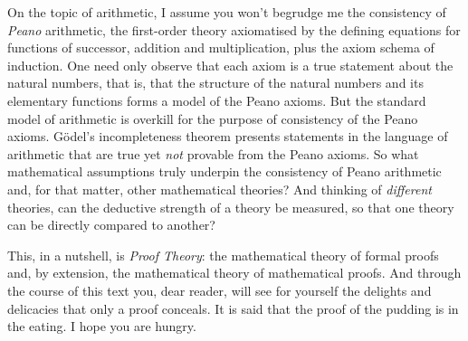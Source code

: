 
On the topic of arithmetic, I assume you won't begrudge me the consistency of \emph{Peano} arithmetic, the first-order theory axiomatised by the defining equations for functions of successor, addition and multiplication, plus the axiom schema of induction.
One need only observe that each axiom is a true statement about the natural numbers, that is, that the structure of the natural numbers and its elementary functions forms a model of the Peano axioms.
But the standard model of arithmetic is overkill for the purpose of consistency of the Peano axioms.
Gödel's incompleteness theorem presents statements in the language of arithmetic that are true yet \emph{not} provable from the Peano axioms.
So what mathematical assumptions truly underpin the consistency of Peano arithmetic and, for that matter, other mathematical theories?
And thinking of \emph{different} theories, 
can the deductive strength of a theory be measured, so that one theory can be directly compared to another?

This, in a nutshell, is
\emph{Proof Theory}: the mathematical theory of formal proofs and, by extension, the mathematical theory of mathematical proofs.
%
And through the course of this text you, dear reader, will see  for yourself the delights and delicacies that only a proof conceals.
It is said that the proof of the pudding is in the eating.
%
I hope you are hungry.

